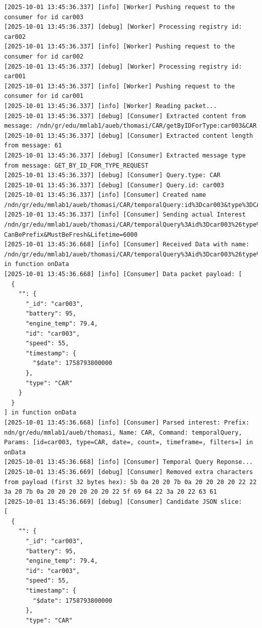 \documentclass{article}
\begin{document}
\begin{lstlisting}[language=log, caption={Logs of the SeEDS Service of the \emph{UMemphis} node, after getting a response from \emph{GET by TYPE}}, label={lst:get-by-type-umemphis}]
[2025-10-01 13:45:36.337] [info] [Worker] Pushing request to the consumer for id car003
[2025-10-01 13:45:36.337] [debug] [Worker] Processing registry id: car002
[2025-10-01 13:45:36.337] [info] [Worker] Pushing request to the consumer for id car002
[2025-10-01 13:45:36.337] [debug] [Worker] Processing registry id: car001
[2025-10-01 13:45:36.337] [info] [Worker] Pushing request to the consumer for id car001
[2025-10-01 13:45:36.337] [info] [Worker] Reading packet...
[2025-10-01 13:45:36.337] [debug] [Consumer] Extracted content from message: /ndn/gr/edu/mmlab1/aueb/thomasi/CAR/getByIDForType:car003&CAR
[2025-10-01 13:45:36.337] [debug] [Consumer] Extracted content length from message: 61
[2025-10-01 13:45:36.337] [debug] [Consumer] Extracted message type from message: GET_BY_ID_FOR_TYPE_REQUEST
[2025-10-01 13:45:36.337] [debug] [Consumer] Query.type: CAR
[2025-10-01 13:45:36.337] [debug] [Consumer] Query.id: car003
[2025-10-01 13:45:36.337] [info] [Consumer] Created name /ndn/gr/edu/mmlab1/aueb/thomasi/CAR/temporalQuery:id%3Dcar003&type%3DCAR&date%3D&count%3D&timeframe%3D&filters%3D
[2025-10-01 13:45:36.337] [info] [Consumer] Sending actual Interest /ndn/gr/edu/mmlab1/aueb/thomasi/CAR/temporalQuery%3Aid%3Dcar003%26type%3DCAR%26date%3D%26count%3D%26timeframe%3D%26filters%3D?CanBePrefix&MustBeFresh&Lifetime=6000
[2025-10-01 13:45:36.668] [info] [Consumer] Received Data with name: /ndn/gr/edu/mmlab1/aueb/thomasi/CAR/temporalQuery%3Aid%3Dcar003%26type%3DCAR%26date%3D%26count%3D%26timeframe%3D%26filters%3D in function onData
[2025-10-01 13:45:36.668] [info] [Consumer] Data packet payload: [
  {
    "": {
      "_id": "car003",
      "battery": 95,
      "engine_temp": 79.4,
      "id": "car003",
      "speed": 55,
      "timestamp": {
        "$date": 1758793800000
      },
      "type": "CAR"
    }
  }
] in function onData
[2025-10-01 13:45:36.668] [info] [Consumer] Parsed interest: Prefix: ndn/gr/edu/mmlab1/aueb/thomasi, Name: CAR, Command: temporalQuery, Params: [id=car003, type=CAR, date=, count=, timeframe=, filters=] in onData
[2025-10-01 13:45:36.668] [info] [Consumer] Temporal Query Reponse...
[2025-10-01 13:45:36.669] [debug] [Consumer] Removed extra characters from payload (first 32 bytes hex): 5b 0a 20 20 7b 0a 20 20 20 20 22 22 3a 20 7b 0a 20 20 20 20 20 20 22 5f 69 64 22 3a 20 22 63 61 
[2025-10-01 13:45:36.669] [debug] [Consumer] Candidate JSON slice:
[
  {
    "": {
      "_id": "car003",
      "battery": 95,
      "engine_temp": 79.4,
      "id": "car003",
      "speed": 55,
      "timestamp": {
        "$date": 1758793800000
      },
      "type": "CAR"

\end{lstlisting}
\end{document}
